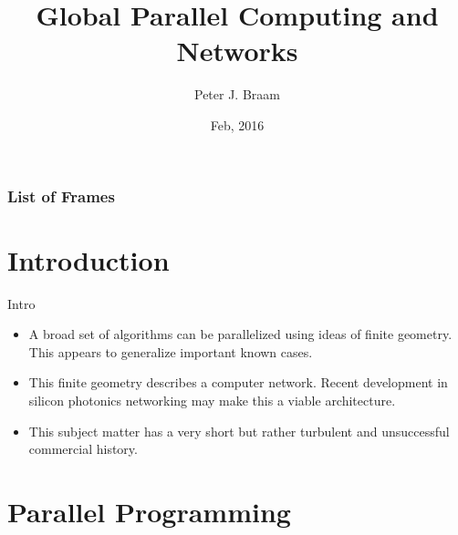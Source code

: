 \documentclass{beamer}
\author[Peter J. Braam]{Peter J. Braam}
\title[Global Parallel Computing \hspace{2em}\insertframenumber/\inserttotalframenumber]
{Global Parallel Computing and Networks}
\date{Feb, 2016} %
\institute{Parallel Scientific, LLC}
\makeatletter
\newcommand\listofframes{\@starttoc{lbf}}
\makeatother
\begin{document}
\begin{frame}
\frametitle{List of Frames}
\listofframes
\end{frame}




\maketitle

\tableofcontents 


\section{Introduction}

\begin{frame}{Intro}

\begin{itemize}
    \item A broad set of algorithms can be parallelized using ideas of finite geometry.  This appears to generalize important known cases.
    \item This finite geometry describes a computer network. Recent development in silicon photonics networking may make this a viable architecture.
    \item This subject matter has a very short but rather turbulent and unsuccessful commercial history. 
\end{itemize}  
\end{frame}


\section{Parallel Programming}
\end{document}
